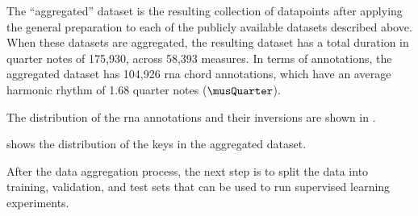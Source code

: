 
The ``aggregated'' dataset is the resulting collection of
datapoints after applying the general preparation to each of
the publicly available datasets described above. When these
datasets are aggregated, the resulting dataset has a total
duration in quarter notes of 175,930, across 58,393
measures. In terms of annotations, the aggregated dataset
has 104,926 \gls{rna} chord annotations, which have an
average harmonic rhythm of 1.68 quarter notes
($\musQuarter$).

The distribution of the \gls{rna} annotations and their
inversions are shown in .



 shows the distribution of
the keys in the aggregated dataset. 

After the data aggregation process, the next step is to
split the data into training, validation, and test sets that
can be used to run supervised learning experiments.

